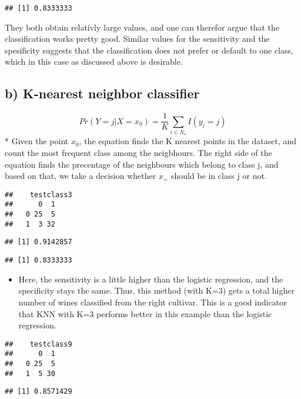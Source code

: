 \documentclass[]{article}
\providecommand{\tightlist}{%
  \setlength{\itemsep}{0pt}\setlength{\parskip}{0pt}}
\begin{document}
\begin{verbatim}
## [1] 0.8333333
\end{verbatim}

They both obtain relativly large values, and one can therefor argue that
the classification works pretty good. Similar values for the sensitivity
and the spesificity suggests that the classification does not prefer or
default to one class, which in this case as discussed above is
desirable.

\subsection{b) K-nearest neighbor
classifier}\label{b-k-nearest-neighbor-classifier}

\[
Pr(Y=j|X=x_0)=\frac{1}{K} \sum_{i \in N_o} I(y_i=j)
\] * Given the point \(x_0\), the equation finds the K nearest points in
the dataset, and count the most frequent class among the neigbhours. The
right side of the equation finds the precentage of the neighbours which
belong to class j, and based on that, we take a decision whether \(x_=\)
should be in class j or not.

\begin{verbatim}
##    testclass3
##      0  1
##   0 25  5
##   1  3 32
\end{verbatim}

\begin{verbatim}
## [1] 0.9142857
\end{verbatim}

\begin{verbatim}
## [1] 0.8333333
\end{verbatim}

\begin{itemize}
\tightlist
\item
  Here, the sensitivity is a little higher than the logistic regression,
  and the specificity stays the same. Thus, this method (with K=3) gets
  a total higher number of wines classified from the right cultivar.
  This is a good indicator that KNN with K=3 performs better in this
  example than the logistic regression.
\end{itemize}

\begin{verbatim}
##    testclass9
##      0  1
##   0 25  5
##   1  5 30
\end{verbatim}

\begin{verbatim}
## [1] 0.8571429
\end{verbatim}
\end{document}
